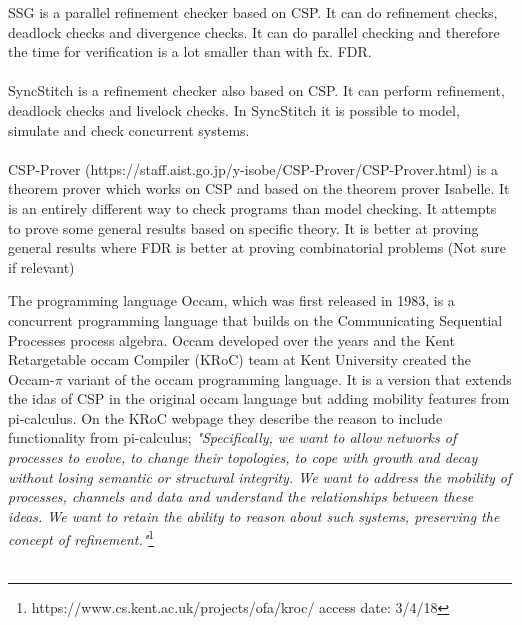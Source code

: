 \documentclass[a4paper]{report}
\begin{document}
SSG is a parallel refinement checker based on CSP. It can do refinement checks, deadlock checks and divergence checks. It can do parallel checking and therefore the time for verification is a lot smaller than with fx. FDR. \\\\

SyncStitch is a refinement checker also based on CSP. It can perform refinement, deadlock checks and livelock checks. In SyncStitch it is possible to model, simulate and check concurrent systems.  \\\\

CSP-Prover\cite{Isobe2005} (https://staff.aist.go.jp/y-isobe/CSP-Prover/CSP-Prover.html) is a theorem prover which works on CSP and based on the theorem prover Isabelle. It is an entirely different way to check programs than model checking. It attempts to prove some general results based on specific theory. It is better at proving general results where FDR is better at proving combinatorial problems (Not sure if relevant)


The programming language Occam, which was first released in 1983, is a concurrent programming language that builds on the Communicating Sequential Processes process algebra. Occam developed over the years and the Kent Retargetable occam Compiler (KRoC) team at Kent University created the Occam-$\pi$ variant of the occam programming language. It is a version that extends the idas of CSP in the original occam language but adding mobility features from pi-calculus. On the KRoC webpage they describe the reason to include functionality from pi-calculus; \textit{"Specifically, we want to allow networks of processes to evolve, to change their topologies, to cope with growth and decay without losing semantic or structural integrity. We want to address the mobility of processes, channels and data and understand the relationships between these ideas. We want to retain the ability to reason about such systems, preserving the concept of refinement."}\footnote{https://www.cs.kent.ac.uk/projects/ofa/kroc/ access date: 3/4/18}\\\\
\end{document}
